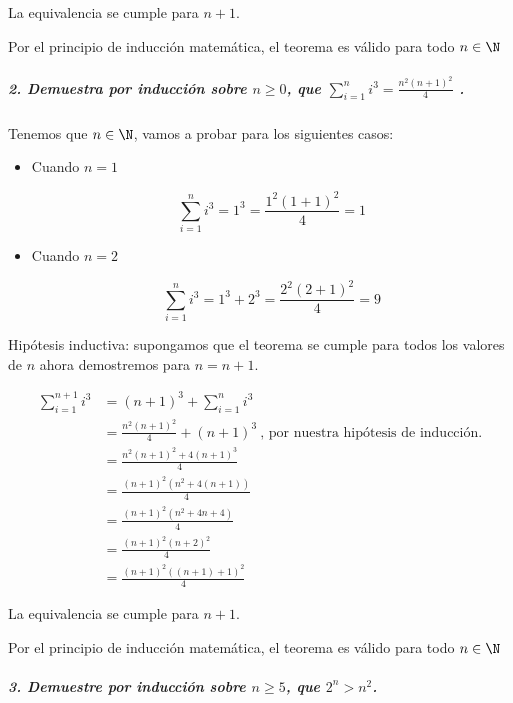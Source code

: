 \documentclass[]{article}
\let\oldsubparagraph\subparagraph
\renewcommand{\subparagraph}[1]{\oldsubparagraph{#1}\mbox{}}
\begin{document}
La equivalencia se cumple para \(n+1\).

Por el principio de inducción matemática, el teorema es válido para todo
\(n \in \N\)

\hypertarget{header-n11}{%
\subparagraph{\texorpdfstring{2. Demuestra por inducción sobre
\(n\ge 0\), que \(\sum_{i=1}^{n}{i^3}= \frac{n^2(n+1)^2}{4}\)
.}{2. Demuestra por inducción sobre n\textbackslash{}ge 0, que \textbackslash{}sum\_\{i=1\}\^{}\{n\}\{i\^{}3\}= \textbackslash{}frac\{n\^{}2(n+1)\^{}2\}\{4\} .}}\label{header-n11}}

Tenemos que \(n \in \N\), vamos a probar para los siguientes casos:

\begin{itemize}
\item
  Cuando \(n = 1\)

  \[\sum_{i=1}^{n}{i^3}= 1^3=\frac{1^2(1+1)^2}{4} = 1\]
\item
  Cuando \(n = 2\)

  \[\sum_{i=1}^{n}{i^3}= 1^3 + 2^3=\frac{2^2(2+1)^2}{4} = 9\]
\end{itemize}

Hipótesis inductiva: supongamos que el teorema se cumple para todos los
valores de \(n\) ahora demostremos para \(n = n+1\).

\begin{equation}
\begin{split}
\sum_{i=1}^{n+1}{i^3} & = (n+1)^3 + \sum_{i=1}^{n}{i^3} \\
& = \frac{n^2(n+1)^2}{4} + (n+1)^3 \ \text {, por nuestra hipótesis de inducción.} \\ 
& = \frac{n^2(n+1)^2 + 4(n+1)^3}{4} \\
& = \frac{(n+1)^2(n^2+4(n+1))}{4} \\
& = \frac{(n+1)^2(n^2+4n+4)}{4} \\
& = \frac{(n+1)^2(n+2)^2}{4} \\
& = \frac{(n+1)^2((n+1)+1)^2}{4}
\end{split}
\end{equation}

La equivalencia se cumple para \(n+1\).

Por el principio de inducción matemática, el teorema es válido para todo
\(n \in \N\)

\hypertarget{header-n7}{%
\subparagraph{\texorpdfstring{3. Demuestre por inducción sobre
\(n\ge5\), que
\(2^n > n^2\).}{3. Demuestre por inducción sobre n\textbackslash{}ge5, que 2\^{}n \textgreater{} n\^{}2.}}\label{header-n7}}
\end{document}
